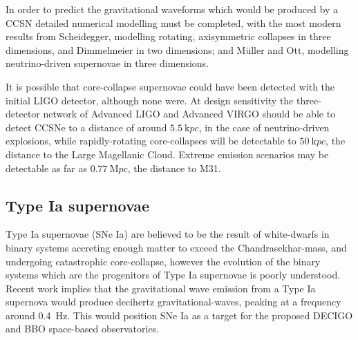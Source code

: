 In order to predict the gravitational waveforms which would be
produced by a CCSN detailed numerical modelling must be completed,
with the most modern results from
Scheidegger\cite{2010A&A...514A..51S}, modelling rotating,
axisymmetric collapses in three dimensions, and
Dimmelmeier\cite{2008PhRvD..78f4056D} in two dimensions; and
M\"uller\cite{2012A&A...537A..63M} and Ott\cite{2013ApJ...768..115O},
modelling neutrino-driven supernovae in three dimensions.

It is possible that core-collapse supernovae could have been detected
with the initial LIGO detector\cite{2009LRR....12....2S}, although
none were. At design sensitivity the three-detector network of
Advanced LIGO and Advanced VIRGO should be able to detect CCSNe to a
distance of around $\SI{5.5}{\kilo pc}$, in the case of
neutrino-driven explosions, while rapidly-rotating core-collapses will
be detectable to $\SI{50}{\kilo pc}$, the distance to the Large
Magellanic Cloud. Extreme emission scenarios may be detectable as far
as $\SI{0.77}{\mega pc}$, the distance to M31\cite{2016PhRvD..93d2002G}.

\subsection{Type Ia supernovae}
\label{sec:type-ia-supernovae}



Type Ia supernovae (SNe Ia) are believed to be the result of
white-dwarfs in binary systems accreting enough matter to exceed the
Chandrasekhar-mass, and undergoing catastrophic
core-collapse\cite{2013MNRAS.429.1156S}, however the evolution of the
binary systems which are the progenitors of Type Ia supernovae is
poorly understood. Recent work\cite{2015PhRvD..92l4013S} implies that
the gravitational wave emission from a Type Ia supernova would produce
decihertz gravitational-waves, peaking at a frequency around
\SI{0.4}{\hertz}. This would position SNe Ia as a target for the
proposed DECIGO and BBO space-based observatories.

